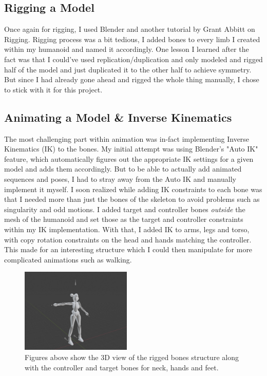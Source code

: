 \documentclass[acmtog]{acmart}
\begin{document}
\subsection{Rigging a Model}
Once again for rigging, I used Blender and another tutorial by Grant Abbitt\cite{Blender:Rigging:Tutorial} on Rigging. Rigging process was a bit tedious, I added bones to every limb I created within my humanoid and named it accordingly. One lesson I learned after the fact was that I could've used replication/duplication and only modeled and rigged half of the model and just duplicated it to the other half to achieve symmetry. But since I had already gone ahead and rigged the whole thing manually, I chose to stick with it  for this project.

\subsection{Animating a Model \& Inverse Kinematics}
The most challenging part within animation was in-fact implementing Inverse Kinematics (IK) to the bones. My initial attempt was using Blender's "Auto IK" feature, which automatically figures out the appropriate IK settings for a given model and adds them accordingly. But to be able to actually add animated sequences and poses, I had to stray away from the Auto IK and manually implement it myself. I soon realized while adding IK constraints to each bone was that I needed more than just the bones of the skeleton to avoid problems such as singularity and odd motions. I added target and controller bones \textit{outside} the mesh of the humanoid and set those as the target and controller constraints within my IK implementation. With that, I added IK to arms, legs and torso, with copy rotation constraints on the head and hands matching the controller. This made for an interesting structure which I could then manipulate for more complicated animations such as walking. 

\begin{figure}[ht]
  \centering
  \includegraphics[width=0.47\textwidth]{images/rigged.png}
  \caption{Figures above show the 3D view of the rigged bones structure along with the controller and target bones for neck, hands and feet.}  \label{fig:rigged}
\end{figure}
\end{document}
